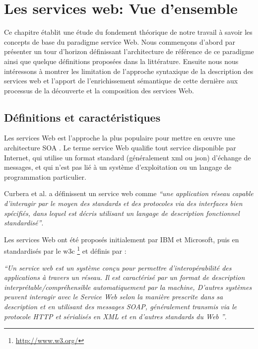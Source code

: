 \chapter{Les services web: Vue d'ensemble}
Ce chapitre établit une étude du fondement théorique de notre travail
à savoir les concepts de base du paradigme service Web.  Nous
commençons d'abord par présenter un tour d'horizon définissant
l'architecture de référence de ce paradigme ainsi que quelque
définitions proposées dans la littérature. Ensuite nous nous
intéressons à montrer les limitation de l'approche syntaxique de la
description des services web et l'apport de l'enrichissement
sémantique de cette dernière aux processus de la découverte et la
composition des services Web.

\newpage
\section{Définitions et caractéristiques}
\label{sec:ws-notions-de-base}

Les services Web est l'approche la plus populaire pour mettre en œuvre
une architecture SOA . Le terme service Web qualifie tout service
disponible par Internet, qui utilise un format standard (généralement
\acrshort{xml} ou \acrshort{json}) d'échange de messages, et qui n'est
pas lié à un système d'exploitation ou un langage de programmation
particulier.

\label{sec:ws-definition}
Curbera et al. \cite{curbera2001web} a définissent un service web
comme \emph{``une application réseau capable d'interagir par le moyen
  des standards et des protocoles via des interfaces bien spécifiés,
  dans lequel est décris utilisant un langage de description
  fonctionnel standardisé''}.

Les services Web ont été proposés initialement par IBM
\cite{kreger2001web} et Microsoft, puis en standardisés par le
\acrshort{w3c} \footnote{\url{http://www.w3.org/}} et définis
\cite{WSA} par :

\emph{``Un service web est un système conçu pour permettre
  d'interopérabilité des applications à travers un réseau.  Il est
  caractérisé par un format de description
  interprétable/compréhensible automatiquement par la machine,
  D'autres systèmes peuvent interagir avec le Service Web selon la
  manière prescrite dans sa description et en utilisant des messages
  SOAP, généralement transmis via le protocole HTTP et sérialisés en
  XML et en d'autres standards du Web ''}.

